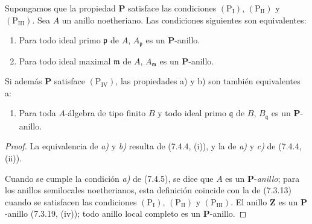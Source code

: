 \begin{corollary}[7.4.5]
\label{IV.2.s7.4.5-fr}
Supongamos que la propiedad $\boldsymbol P$ satisface las condiciones
$(\mathrm P_{\mathrm I})$, $(\mathrm P_{\mathrm{II}})$ y
$(\mathrm P_{\mathrm{III}})$. Sea $A$ un anillo noetheriano. Las
condiciones siguientes son equivalentes:
\begin{enumerate}
\item[\emph{a)}] Para todo ideal primo $\mathfrak p$ de $A$,
$A_{\mathfrak p}$ es un $\boldsymbol P$-anillo.
\item[\emph{b)}] Para todo ideal maximal $\mathfrak m$ de $A$,
$A_{\mathfrak m}$ es un $\boldsymbol P$-anillo.
\end{enumerate}
Si además $\boldsymbol P$ satisface $(\mathrm P_{\mathrm{IV}})$, las
propiedades \textup{a)} y \textup{b)} son también equivalentes a:
\begin{enumerate}
\item[\emph{c)}] Para toda $A$-álgebra de tipo finito $B$ y todo ideal
primo $\mathfrak q$ de $B$, $B_{\mathfrak q}$ es un
$\boldsymbol P$-anillo.
\end{enumerate}
\end{corollary}

\begin{proof}
La equivalencia de \emph{a)} y \emph{b)} resulta de (7.4.4, (i)), y la de \emph{a)} y \emph{c)} de
(7.4.4, (ii)).

Cuando se cumple la condición \emph{a)} de (7.4.5), se dice que $A$ es un
$\boldsymbol P$-\emph{anillo}; para los anillos semilocales noetherianos, esta
definición coincide con la de (7.3.13) cuando se satisfacen las
condiciones $(\mathrm P_{\mathrm I})$, $(\mathrm P_{\mathrm{II}})$ y
$(\mathrm P_{\mathrm{III}})$. El anillo $\mathbf Z$ es un
$\boldsymbol P$-anillo (7.3.19, (iv)); todo anillo local completo es un
$\boldsymbol P$-anillo.
\end{proof}
